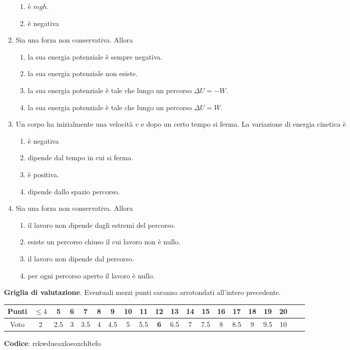 \documentclass{article}
\begin{document}
\begin{enumerate}
\begin{enumerate}[label=\Alph*.]
    \item è $mgh$.
    \item è negativa
  \end{enumerate}
  \item Sia  una forza non conservativa. Allora
  \begin{enumerate}[label=\Alph*.]
    \item la sua energia potenziale è sempre negativa.
    \item la sua energia potenziale non esiste.
    \item la sua energia potenziale è tale che lungo un percorso $\Delta U=-W$.
    \item la sua energia potenziale è tale che lungo un percorso $\Delta U=W$.
  \end{enumerate}
  \item Un corpo ha inizialmente una velocità $v$ e dopo un certo tempo si ferma. La variazione di energia cinetica è
  \begin{enumerate}[label=\Alph*.]
    \item è negativa
    \item dipende dal tempo in cui si ferma.
    \item è positiva.
    \item dipende dallo spazio percorso.
  \end{enumerate}
  \item Sia  una forza non conservativa. Allora
  \begin{enumerate}[label=\Alph*.]
    \item il lavoro non dipende dagli estremi del percorso.
    \item esiste un percorso chiuso il cui lavoro non è nullo.
    \item il lavoro non dipende dal percorso.
    \item per ogni percorso aperto il lavoro è nullo.
  \end{enumerate}
\end{enumerate}








\newpage \maketitle \centering \textbf{Griglia di valutazione}. Eventuali mezzi punti saranno arrotondati all'intero precedente. \begin{table}[h]     \centering \begin{tabular}{|c|c|c|c|c|c|c|c|c|c|c|c|c|c|c|c|c|c|c|c|} \hline Punti &  $\leq 4$ & 5 & 6 & 7 & 8 & 9 & 10 & 11 & \textbf{12} & 13 & 14 & 15 & 16 & 17 & 18 & 19 & 20 \\ \hline Voto & 2 & 2.5 & 3 & 3.5 & 4 & 4.5 & 5 & 5.5 & \textbf{6} & 6.5 & 7 & 7.5 & 8 & 8.5 & 9 & 9.5 & 10 \\ \hline \end{tabular} \end{table} 
\textbf{Codice}: rrkwdueaxloeoxchltefo
\end{document}
